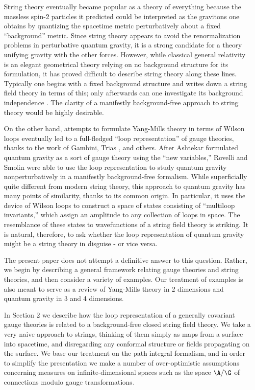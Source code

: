 String theory eventually became popular as a theory of everything
because the massless spin-2 particles it predicted could be interpreted
as the gravitons one obtains by quantizing the spacetime
metric perturbatively about a fixed ``background'' metric.  Since
string theory appears to avoid the renormalization problems in
perturbative quantum gravity, it is a strong candidate for a theory
unifying gravity with the other forces.
However, while classical general relativity is an elegant
geometrical theory relying on no background structure for its formulation,
it has proved difficult to describe string theory along these lines.
Typically one begins with a fixed background structure and writes down
a string field theory in terms of this;
only afterwards can one investigate its background
independence \cite{Zwiebach}.
The clarity of a manifestly background-free approach
to string theory would be highly desirable.

On the other hand, attempts to formulate Yang-Mills theory in terms of
Wilson loops eventually led to a full-fledged ``loop representation'' of
gauge theories, thanks to the work of Gambini, Trias \cite{GamTri}, and
others.   After Ashtekar \cite{A} formulated quantum gravity as a sort of gauge
theory using the ``new variables,''  Rovelli and Smolin \cite{RS}
were able to use
the loop representation to study quantum gravity nonperturbatively in a
manifestly background-free formalism.   While superficially
quite different from modern string theory, this approach to quantum gravity
has many points of similarity, thanks to its common origin.  In particular,
it uses the device of Wilson loops to construct a space of states
consisting of ``multiloop invariants,'' which assign an amplitude to any
collection of loops in space.  The resemblance of these states to
wavefunctions of a string field theory is striking.  It is natural,
therefore, to ask whether the loop representation of quantum gravity might
be a string theory in disguise - or vice versa.

The present paper does not attempt a definitive answer to this question.
Rather, we begin by describing a general framework relating gauge theories and
string theories, and then consider a variety of examples.  Our treatment of
examples is also meant to serve as a review of
Yang-Mills theory in 2 dimensions and quantum gravity in 3 and 4 dimensions.

In Section 2 we describe how the loop
representation of a generally covariant gauge theories is related to a
background-free closed string field theory. We take a very naive approach
to strings, thinking of them simply as maps from a surface into spacetime,
and disregarding any conformal structure or fields propagating on the
surface. We base our treatment on the path integral formalism, and in
order to simplify the presentation we make a number of over-optimistic
assumptions concerning measures on infinite-dimensional spaces such as the
space $\A/\G$ of connections modulo gauge transformations.


